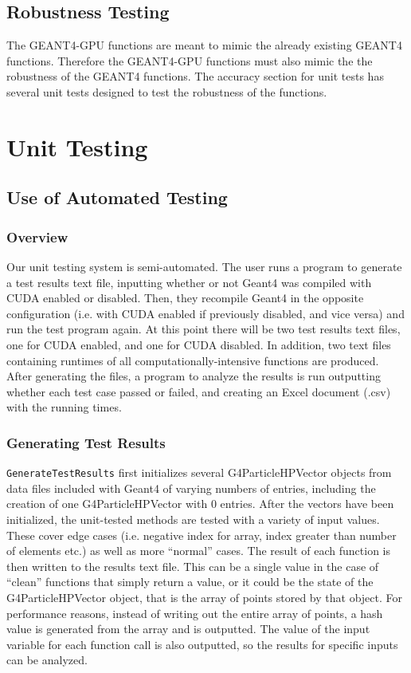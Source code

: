 \documentclass[12pt]{article}
\begin{document}
\subsection{Robustness Testing}
The GEANT4-GPU functions are meant to mimic the already existing GEANT4 functions. Therefore the GEANT4-GPU functions must also mimic the the robustness of the GEANT4 functions. The accuracy section for unit tests has several unit tests designed to test the robustness of the functions. 

\section{Unit Testing}
\subsection{Use of Automated Testing}
\subsubsection{Overview}
Our unit testing system is semi-automated. The user runs a program to generate a test results text file, inputting whether or not Geant4 was compiled with CUDA enabled or disabled. Then, they recompile Geant4 in the opposite configuration (i.e. with CUDA enabled if previously disabled, and vice versa) and run the test program again. At this point there will be two test results text files, one for CUDA enabled, and one for CUDA disabled. In addition, two text files containing runtimes of all computationally-intensive functions are produced. After generating the files, a program to analyze the results is run outputting whether each test case passed or failed, and creating an Excel document (.csv) with the running times.

\subsubsection{Generating Test Results}
\texttt{GenerateTestResults} first initializes several G4ParticleHPVector objects from data files included with Geant4 of varying numbers of entries, including the creation of one G4ParticleHPVector with 0 entries. After the vectors have been initialized, the unit-tested methods are tested with a variety of input values. These cover edge cases (i.e. negative index for array, index greater than number of elements etc.) as well as more ``normal'' cases. The result of each function is then written to the results text file. This can be a single value in the case of ``clean'' functions that simply return a value, or it could be the state of the G4ParticleHPVector object, that is the array of points stored by that object. For performance reasons, instead of writing out the entire array of points, a hash value is generated from the array and is outputted. The value of the input variable for each function call is also outputted, so the results for specific inputs can be analyzed.
\end{document}
